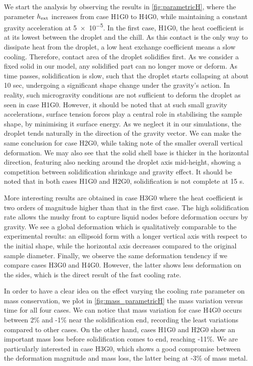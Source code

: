 We start the analysis by observing the results in \cref{fig:parametricH}, where the parameter $h_{\text{ext}}$ increases from case H1G0 to H4G0, while maintaining
a constant gravity acceleration at \SI{5e-5}{\uacceleration}.
In the first case, H1G0, the heat coefficient is at its lowest between the droplet and the chill. As this contact is the only way to dissipate heat from the droplet,
a low heat exchange coefficient means a slow cooling. Therefore, contact area of the droplet solidifies first. As we consider a fixed solid in our model, any solidified 
part can no longer move or deform. As time passes, solidification is slow, such that the droplet starts collapsing at about 10 sec, undergoing a significant shape change under
the gravity's action. In reality, such microgravity conditions are not sufficient to deform the droplet as seen in case H1G0. However, it should be noted
that at such small gravity accelerations, surface tension forces play a central role in stabilising the sample shape, by minimising it surface energy.
As we neglect it in our simulations, the droplet tends naturally in the direction of the gravity vector.
We can make the same conclusion for case H2G0, while taking note of the smaller overall vertical deformation. 
We may also see that the solid shell base is thicker in the horizontal direction, featuring also necking around the droplet axis mid-height, showing
a competition between solidification shrinkage and gravity effect. It should be noted that in both cases H1G0 and H2G0, solidification is not complete 
at 15 s.

More interesting results are obtained in case H3G0 where the heat coefficient is two orders of magnitude 
higher than that in the first case. The high solidification rate allows the mushy front 
to capture liquid nodes before deformation occurs by gravity. We see a global deformation which is qualitatively comparable to the experimental 
results: an ellipsoid form with a longer vertical axis with respect to the initial shape, while the horizontal axis decreases compared to the original
sample diameter. Finally, we observe the same deformation tendency if we compare cases H3G0 and H4G0. However, the latter shows less deformation
on the sides, which is the direct result of the fast cooling rate.

In order to have a clear idea on the effect varying the cooling rate parameter on mass conservation, we plot in \cref{fig:mass_parametricH}
the mass variation versus time for all four cases. We can notice that mass variation for case H4G0 occurs between 2\% and -1\% near the solidification end,
recording the least variations compared to other cases. On the other hand, cases H1G0 and H2G0 show an important mass loss before solidification comes to end,
reaching -11\%. We are particularly interested in case H3G0, which shows a good compromise between the deformation magnitude and mass loss, the latter being at -3\% of mass metal.

